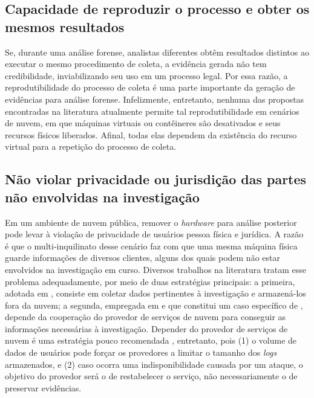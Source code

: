 \subsection{Capacidade de reproduzir o processo e obter os mesmos resultados}
\label{sec:reprodutibilidade}

Se, durante uma análise forense, analistas diferentes obtêm resultados distintos ao executar o mesmo procedimento de coleta, a evidência gerada não tem credibilidade, inviabilizando seu uso em um processo legal. 
%
Por essa razão, a reprodutibilidade do processo de coleta é uma parte importante da geração de evidências para análise forense.
%
Infelizmente, entretanto, nenhuma das propostas encontradas na literatura atualmente permite tal reprodutibilidade em cenários de nuvem, em que máquinas virtuais ou contêineres são desativados e seus recursos físicos liberados.
%
Afinal, todas elas dependem da existência do recurso virtual para a repetição do processo de coleta.

\subsection{Não violar privacidade ou jurisdição das partes não envolvidas na investigação}
\label{sec:legais}

Em um ambiente de nuvem pública, remover o \textit{hardware} para análise posterior pode levar à violação de privacidade de usuários pessoa física e jurídica.
%
A razão é que o multi-inquilinato desse cenário faz com que uma mesma máquina física guarde informações de diversos clientes, alguns dos quais podem não estar envolvidos na investigação em curso.
%
Diversos trabalhos na literatura tratam esse problema adequadamente, por meio de duas estratégias principais: a primeira, adotada em \cite{ReichertAutoAcquisition:2015,GeorgeDF2CE:2012,PoiselVMI:2013,DykstraFROST:2013,FaaSIndexedSearch:2012}, consiste em coletar dados pertinentes à investigação e armazená-los fora da nuvem; a segunda, empregada em \cite{SangLogApproach:2013} e que constitui um caso específico de \cite{GeorgeDF2CE:2012}, depende da cooperação do provedor de serviços de nuvem para conseguir as informações necessárias à investigação. 
%
Depender do provedor de serviços de nuvem é uma estratégia pouco recomendada  \cite{ClarkeReviewOfChallenges2015}, entretanto, pois (1) o volume de dados de usuários pode forçar os provedores a limitar o tamanho dos \textit{logs} armazenados, e (2) caso ocorra uma indisponibilidade causada por um ataque, o objetivo do provedor será o de restabelecer o serviço, não necessariamente o de preservar evidências. 


